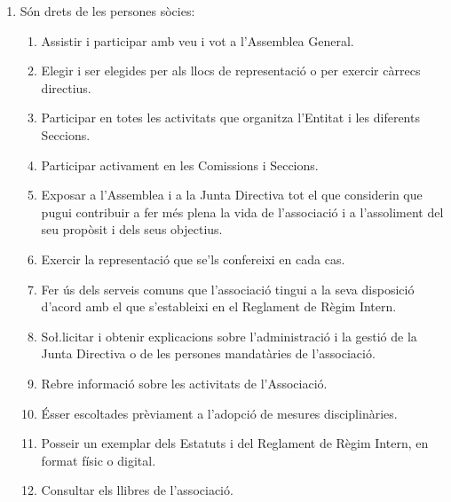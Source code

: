 \documentclass[11pt,a4paper]{article}
\newcommand{\JD}{Junta Directiva\xspace}
\newcommand{\AG}{Assemblea General\xspace}
\DeclareRobustCommand{\RRI}{Reglament de Règim Intern\xspace}
\begin{document}
\begin{enumerate}
    \item[] Són drets de les persones sòcies:
    \begin{enumerate}
        \item Assistir i participar amb veu i vot a l'\AG.
        \item Elegir i ser elegides per als llocs de representació o per exercir càrrecs directius.
        \item Participar en totes les activitats que organitza l'Entitat i les diferents Seccions.
        \item Participar activament en les Comissions i Seccions.
        \item Exposar a l'Assemblea i a la \JD tot el que considerin que pugui contribuir a fer més plena la vida de l'associació i a l'assoliment del seu propòsit i dels seus objectius.
        \item Exercir la representació que se'ls confereixi en cada cas.
        \item Fer ús dels serveis comuns que l'associació tingui a la seva disposició d'acord amb el que s'estableixi en el \RRI.
        \item So\l.licitar i obtenir explicacions sobre l'administració i la gestió de la \JD o de les persones mandatàries de l'associació.
        \item Rebre informació sobre les activitats de l'Associació.
        \item Ésser escoltades prèviament a l'adopció de mesures disciplinàries.
        \item Posseir un exemplar dels Estatuts i del \RRI, en format físic o digital.
        \item Consultar els llibres de l'associació.
    \end{enumerate}
\end{enumerate}

\end{document}
